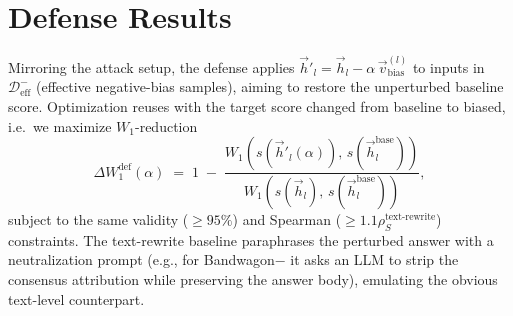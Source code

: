 \documentclass[11pt]{article}
\newcommand{\eg}{{e.g.}}
\let\Cref\crtCref
\begin{document}
\section{Defense Results}
\label{app:defense_full}

Mirroring the attack setup, the defense applies $\vec{h}'_l = \vec{h}_l - \alpha\,\vec{v}_{\text{bias}}^{(l)}$ to inputs in $\mathcal{D}_{\text{eff}}^{-}$ (effective negative-bias samples), aiming to restore the unperturbed baseline score. Optimization reuses \Cref{alg:alpha_search} with the target score changed from baseline to biased, i.e.\ we maximize $W_1$-reduction
\begin{equation}
    \Delta W_1^{\text{def}}(\alpha) \;=\; 1 \;-\; \frac{W_1\!\left(s(\vec{h}'_l(\alpha)),\, s(\vec{h}_l^{\text{base}})\right)}{W_1\!\left(s(\vec{h}_l),\, s(\vec{h}_l^{\text{base}})\right)},
\end{equation}
subject to the same validity ($\geq 95\%$) and Spearman ($\geq 1.1\rho_S^{\text{text-rewrite}}$) constraints. The text-rewrite baseline paraphrases the perturbed answer with a neutralization prompt (\eg, for Bandwagon$-$ it asks an LLM to strip the consensus attribution while preserving the answer body), emulating the obvious text-level counterpart.
\end{document}
